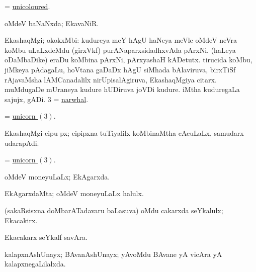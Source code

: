 \bentry
{} 
\gl{\gu}
\expl{}
\bmng
= \hyperlink{unicoloured}{unicoloured}. 
\emng
\eentry

\bentry 
{} 
\gl{\gu}
\expl{}
\bmng
oMdeV baNaNxda; EkavaNiR. 
\emng
\eentry

\bentry
{} 
\gl{\nA}
\bmng
\bnum
{} EkashaqMgi; okokxMbi: 
\banum
{} kudureya meY hAgU haNeya meVle oMdeV neVra koMbu uLaLxdeMdu (girxVkf) purANaparxsidadhxvAda pArxNi.  
 (haLeya oDaMbaDike) eraDu koMbina pArxNi, pArxyashaH kADetutx. 
 tirucida koMbu, jiMkeya pAdagaLu, hoVtana gaDaDx hAgU siMhada bAlaviruva, birxTiSf rAjavaMsha lAMCanadalilx nirUpisalAgiruva, EkashaqMgiya citarx. 
\eanum
\numie
{} 
\banum
{} muMdugaDe mUraneya kudure hUDiruva joVDi kudure. 
 iMtha kuduregaLa sajujx, gADi. 
\hypertarget{unicorn(3)}{} 
\eanum
\numie
\num{3} = \hyperref{kandict_n.pdf}{N}{narwhal}{narwhal}. 
\enum
\emng

\noindent
\gl{\pagu}
\expl{}
\bmng
{} = \hyperlink{unicorn(3)}{unicorn \((3)\)}. 
\emng
\eentry

\bentry
{}
\gl{\nA}
\expl{}
\bmng
EkashaqMgi cipu px; cipipxna tuTiyalilx koMbinaMtha cAcuLaLx, samudarx udarapAdi. 
\emng
\eentry

\bentry
{}
\gl{\nA}
\expl{}
\bmng
= \hyperlink{unicorn(3)}{unicorn \((3)\)}. 
\emng
\eentry

\bentry 
{} 
\gl{\gu}
\expl{}
\bmng
oMdeV moneyuLaLx; EkAgarxda. 
\emng
\eentry

\bentry 
{} 
\gl{\nA}
\expl{}
\bmng
EkAgarxdaMta; oMdeV moneyuLaLx halulx. 
\emng
\eentry

\bentry
{} 
\gl{\nA}
\expl{}
\bmng
(sakaRsisxna doMbarATadavaru baLasuva) oMdu cakarxda seYkalulx; Ekacakirx. 
\emng
\eentry

\bentry
{} 
\gl{\nA}
\expl{}
\bmng
Ekacakarx seYkalf savAra. 
\emng
\eentry

\bentry
{} 
\gl{\gu}
\expl{}
\bmng
kalapxnAshUnayx; BAvanAshUnayx; yAvoMdu BAvane yA vicAra yA kalapxnegaLilalxda. 
\emng
\eentry

